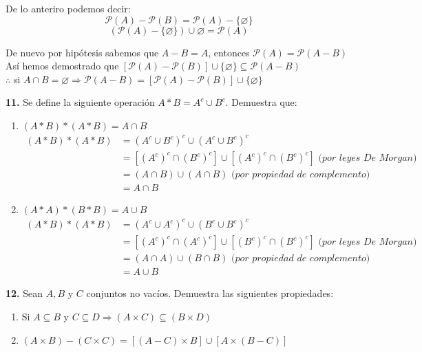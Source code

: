 \documentclass[12pt]{article}
\begin{document}
\begin{enumerate}[label=\alph*)]
    De lo anteriro podemos decir:
    \[\mathcal{P}(A) - \mathcal{P}(B) = \mathcal{P}(A) - \{\varnothing\}\]
    \[(\mathcal{P}(A) - \{\varnothing\}) \cup {\varnothing} = \mathcal{P}(A)\]

    De nuevo por hipótesis sabemos que $A - B = A$, entonces $\mathcal{P}(A) = \mathcal{P}(A - B)$\\

    Así hemos demostrado que $[\mathcal{P}(A) - \mathcal{P}(B)] \cup \{\varnothing\} \subseteq \mathcal{P}(A - B)$\\

    $\therefore$ si $A \cap B = \varnothing \Longrightarrow \mathcal{P}(A - B) = [\mathcal{P}(A) - \mathcal{P}(B)] \cup \{\varnothing\}$
\end{enumerate}

%
%
\textbf{11.} Se define la siguiente operación $A \ast B = A^c \cup B^c$. Demuestra que:

\begin{enumerate}[label=\alph*)]
    \item $(A \ast B) \ast (A \ast B) = A \cap B$
    \begin{align*}
        (A \ast B) \ast (A \ast B) &= (A^c \cup B^c)^c \cup (A^c \cup B^c)^c\\
        &=[(A^c)^c \cap (B^c)^c] \cup [(A^c)^c \cap (B^c)^c] \textit{ (por leyes De Morgan)}\\
        &= (A \cap B) \cup (A \cap B) \textit{ (por propiedad de complemento)}\\
        &= A \cap B
    \end{align*}

    \item $(A \ast A) \ast (B \ast B) = A \cup B$
    \begin{align*}
        (A \ast B) \ast (A \ast B) &= (A^c \cup A^c)^c \cup (B^c \cup B^c)^c\\
        &=[(A^c)^c \cap (A^c)^c] \cup [(B^c)^c \cap (B^c)^c] \textit{ (por leyes De Morgan)}\\
        &= (A \cap A) \cup (B \cap B) \textit{ (por propiedad de complemento)}\\
        &= A \cup B
    \end{align*}

\end{enumerate}

%
%
\textbf{12.} Sean $A, B$ y $C$ conjuntos no vacíos. Demuestra las siguientes propiedades:

\begin{enumerate}[label=\alph*)]
    \item Si $A \subseteq B$ y $C \subseteq D \Longrightarrow (A \times C) \subseteq (B \times D)$\\

    \item $(A \times B) - (C \times C) = [(A - C) \times B] \cup [A \times (B - C)]$\\

\end{enumerate}
\end{document}
